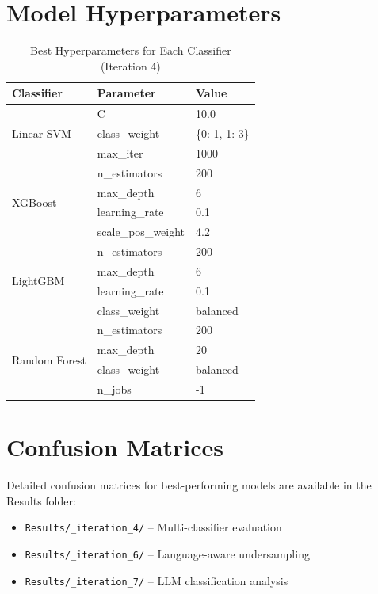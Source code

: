 \documentclass[11pt, titlepage, bibliography=totoc]{scrreprt}
\begin{document}
\section{Model Hyperparameters}

\begin{table}[htbp]
\centering
\caption{Best Hyperparameters for Each Classifier (Iteration 4)}
\label{tab:appendix-hyperparams}
\begin{tabular}{@{}llp{8cm}@{}}
\toprule
\textbf{Classifier} & \textbf{Parameter} & \textbf{Value} \\
\midrule
\multirow{3}{*}{Linear SVM} & C & 10.0 \\
 & class\_weight & \{0: 1, 1: 3\} \\
 & max\_iter & 1000 \\
\midrule
\multirow{4}{*}{XGBoost} & n\_estimators & 200 \\
 & max\_depth & 6 \\
 & learning\_rate & 0.1 \\
 & scale\_pos\_weight & 4.2 \\
\midrule
\multirow{4}{*}{LightGBM} & n\_estimators & 200 \\
 & max\_depth & 6 \\
 & learning\_rate & 0.1 \\
 & class\_weight & balanced \\
\midrule
\multirow{4}{*}{Random Forest} & n\_estimators & 200 \\
 & max\_depth & 20 \\
 & class\_weight & balanced \\
 & n\_jobs & -1 \\
\bottomrule
\end{tabular}
\end{table}

\section{Confusion Matrices}

Detailed confusion matrices for best-performing models are available in the Results folder:
\begin{itemize}
    \item \texttt{Results/\_iteration\_4/} -- Multi-classifier evaluation
    \item \texttt{Results/\_iteration\_6/} -- Language-aware undersampling
    \item \texttt{Results/\_iteration\_7/} -- LLM classification analysis
\end{itemize}
\end{document}
